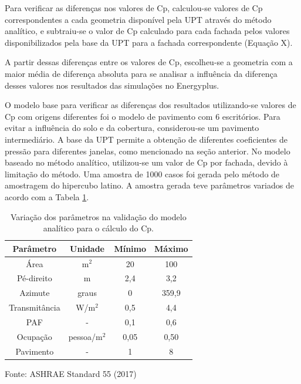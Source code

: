\documentclass[brazil,hardcopy,openany,a5paper]{ufscthesis}
\begin{document}
		
		Para verificar as diferenças nos valores de Cp, calculou-se valores de Cp correspondentes a cada geometria disponível pela UPT através do método analítico, e subtraiu-se o valor de Cp calculado para cada fachada pelos valores disponibilizados pela base da UPT para a fachada correspondente (Equação X).
		
		
		A partir dessas diferenças entre os valores de Cp, escolheu-se a geometria com a maior média de diferença absoluta para se analisar a influência da diferença desses valores nos resultados das simulações no Energyplus.
		
		O modelo base para verificar as diferenças dos resultados utilizando-se valores de Cp com origens diferentes foi o modelo de pavimento com 6 escritórios. Para evitar a influência do solo e da cobertura, considerou-se um pavimento intermediário. A base da UPT permite a obtenção de diferentes coeficientes de pressão para diferentes janelas, como mencionado na seção anterior. No modelo baseado no método analítico, utilizou-se um valor de Cp por fachada, devido à limitação do método. Uma amostra de 1000 casos foi gerada pelo método de amostragem do hipercubo latino. A amostra gerada teve parâmetros variados de acordo com a Tabela \ref{table:cpmethod}.
		
		\begin{table}[h]
			\centering
			\caption{Variação dos parâmetros na validação do modelo analítico para o cálculo do Cp.}
			\label{table:cpmethod}
			\begin{tabular}{|c |c |c |c |}
				\hline
				\textbf{Parâmetro} & \textbf{Unidade} & \textbf{Mínimo} & \textbf{Máximo} \\
				\hline
				Área & m$^2$ & 20 & 100 \\
				\hline
				Pé-direito & m & 2,4 & 3,2 \\
				\hline
				Azimute & graus & 0 & 359,9 \\
				\hline 
				Transmitância & W/m$^2$ & 0,5 & 4,4 \\
				\hline 
				PAF & - & 0,1 & 0,6 \\
				\hline 
				Ocupação & pessoa/m$^2$ & 0,05 & 0,50 \\
				\hline 
				Pavimento & - & 1 & 8 \\
				\hline 
			\end{tabular}
			\begin{flushleft}
				Fonte: ASHRAE Standard 55 (2017)
			\end{flushleft}				
		\end{table}
				
\end{document}
